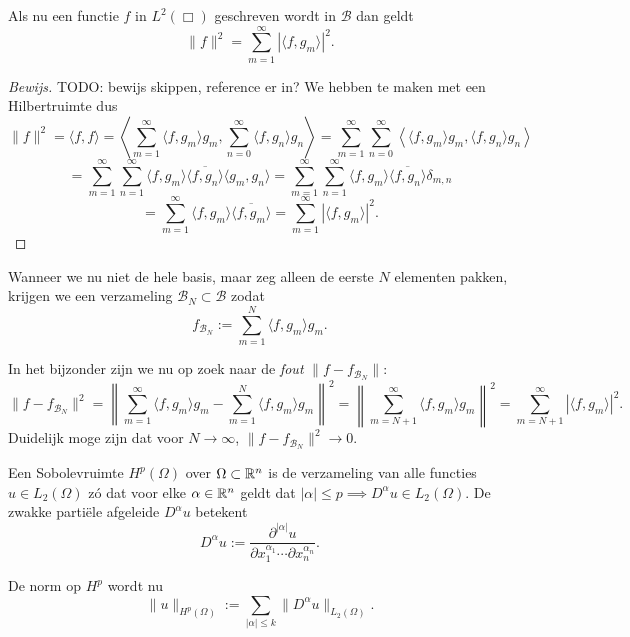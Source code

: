 \begin{lemm}
  Als nu een functie $f$ in $L^2(\Box)$ geschreven wordt in $\mathcal{B}$ dan geldt
  \[
  \|f\|^2 = \sum_{m=1}^\infty | \langle f, g_m \rangle |^2.
  \]
\end{lemm}
\begin{proof}[Bewijs]
  TODO: bewijs skippen, reference er in?
  We hebben te maken met een Hilbertruimte dus
  \[
  \|f\|^2 = \langle f, f \rangle = \left\langle \sum_{m=1}^\infty \langle f, g_m \rangle g_m, \sum_{n=0}^\infty \langle f, g_n \rangle g_n \right\rangle = \sum_{m=1}^\infty \sum_{n=0}^\infty \left\langle \langle f, g_m \rangle g_m, \langle f, g_n \rangle g_n \right \rangle
  \]
  \[
  = \sum_{m=1}^\infty \sum_{n=1}^\infty \langle f, g_m \rangle \overline{\langle f, g_n \rangle}\langle g_m, g_n \rangle = \sum_{m=1}^\infty \sum_{n=1}^\infty \langle f, g_m \rangle \overline{\langle f, g_n \rangle} \delta_{m,n}
  \]
  \[ = \sum_{m=1}^\infty \langle f, g_m \rangle \overline{\langle f, g_m \rangle} = \sum_{m=1}^\infty |\langle f, g_m \rangle |^2.
  \]
\end{proof}

\begin{gevolg}
\label{linfout}
Wanneer we nu niet de hele basis, maar zeg alleen de eerste $N$ elementen pakken, krijgen we een verzameling $\mathcal{B}_N \subset \mathcal{B}$ zodat
\[
f_{\mathcal{B}_N} := \sum_{m = 1}^N \langle f, g_m \rangle g_m.
\]

In het bijzonder zijn we nu op zoek naar de \emph{fout} $\| f - f_{\mathcal{B}_N} \|$:
\[
\| f - f_{\mathcal{B}_N} \|^2 = \left\| \sum_{m=1}^\infty\langle f, g_m \rangle g_m - \sum_{m=1}^N \langle f, g_m \rangle g_m \right\|^2 = \left\| \sum_{m=N+1}^\infty\langle f, g_m \rangle g_m \right\|^2 = \sum_{m=N+1}^\infty | \langle f, g_m \rangle |^2.
\]
Duidelijk moge zijn dat voor $N \to \infty$, $\| f - f_{\mathcal{B}_N} \|^2 \to 0$.
\end{gevolg}

\begin{definitie}[Sobolevruimte]
Een Sobolevruimte $H^p(\Omega)$ over $\Omega \subset \mathbb{R}^n$ is de verzameling van alle functies $u \in L_2(\Omega)$ z\'o dat voor elke $\alpha \in \mathbb{R}^n$ geldt dat $|\alpha| \leq p \implies D^\alpha u \in L_2(\Omega)$. De zwakke parti\"ele afgeleide $D^\alpha u$ betekent
\[
	D^\alpha u := \frac{\partial^{|\alpha|} u}{\partial x_1^{\alpha_1} \cdots \partial x_n^{\alpha_n} }.
\]

De norm op $H^p$ wordt nu
\[
	\| u \|_{H^p(\Omega)} := \sum_{|\alpha| \leq k} \| D^\alpha u \|_{L_2(\Omega)}.
\]
\end{definitie}

